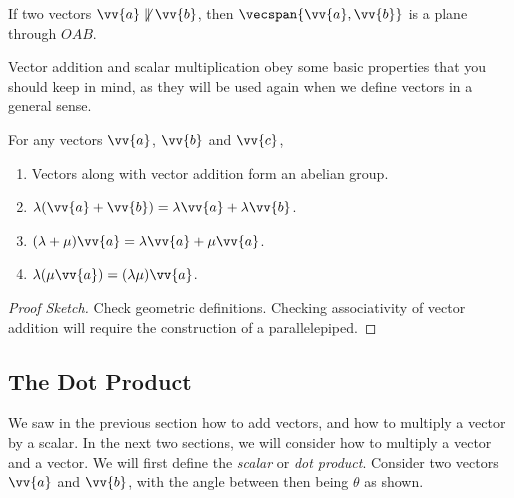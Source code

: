If two vectors $\vv{a} \not \parallel \vv{b}$, then $\vecspan\{\vv{a}, \vv{b}\}$ is a plane through $OAB$.

Vector addition and scalar multiplication obey some basic properties that you should keep in mind, as they will be used again when we define vectors in a general sense.

\begin{proposition}
For any vectors $\vv{a}$, $\vv{b}$ and $\vv{c}$,
\begin{enumerate}[label=(\roman*)]
	\item Vectors along with vector addition form an abelian group.
	\item $\lambda(\vv{a} + \vv{b}) = \lambda \vv{a} + \lambda \vv{b}$.
	\item $(\lambda + \mu)\vv{a} = \lambda\vv{a} + \mu\vv{a}$.
	\item $\lambda(\mu \vv{a}) = (\lambda \mu) \vv{a}$.
\end{enumerate}
\end{proposition}
\begin{proof}[Proof Sketch]
	Check geometric definitions. Checking associativity of vector addition will require the construction of a parallelepiped.
\end{proof}


\subsection{The Dot Product}

We saw in the previous section how to add vectors, and how to multiply a vector by a scalar. In the next two sections, we will consider how to multiply a vector and a vector. 
We will first define the \emph{scalar} or \emph{dot product}.
Consider two vectors $\vv{a}$ and $\vv{b}$, with the angle between then being $\theta$ as shown.

\begin{center}
  \end{center}

